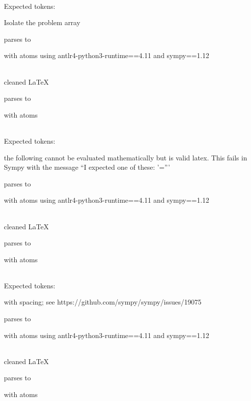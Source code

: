 \documentclass{article}
\begin{document}
\ \\
Expected tokens:


\hrulefill

Isolate the problem array

parses to

with atoms
using antlr4-python3-runtime==4.11 and sympy==1.12

\ \\
cleaned \LaTeX

parses to

with atoms


\ \\
Expected tokens:



\hrulefill

the following cannot be evaluated mathematically but is valid latex. 
This fails in Sympy with the message ``I expected one of these: '='''

parses to

with atoms
using antlr4-python3-runtime==4.11 and sympy==1.12

\ \\
cleaned \LaTeX

parses to

with atoms


\ \\
Expected tokens:



\hrulefill

with spacing; see https://github.com/sympy/sympy/issues/19075

parses to

with atoms
using antlr4-python3-runtime==4.11 and sympy==1.12

\ \\
cleaned \LaTeX

parses to

with atoms

\end{document}

